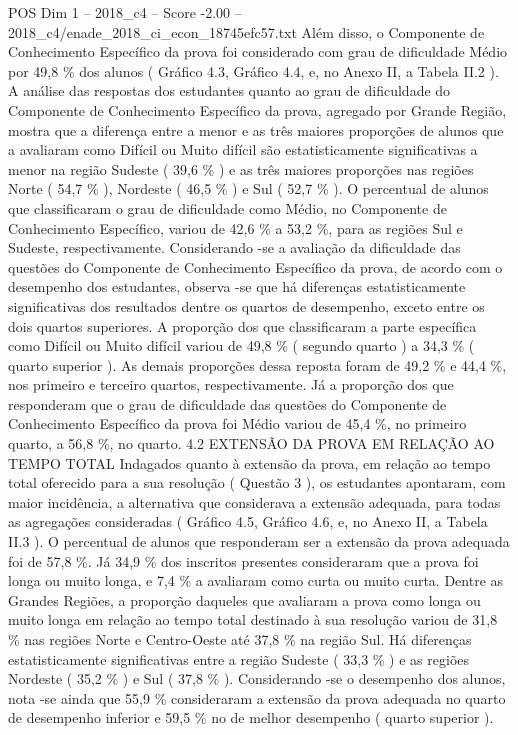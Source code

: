 \begin{textsample}{POS Dim 1 – 2018\_c4 – Score -2.00 – 2018\_c4/enade\_2018\_ci\_econ\_18745efc57.txt}
Além disso, o Componente de Conhecimento Específico da prova foi considerado com grau de dificuldade Médio por 49,8 \% dos alunos ( Gráfico 4.3, Gráfico 4.4, e, no Anexo II, a Tabela II.2 ).
A análise das respostas dos estudantes quanto ao grau de dificuldade do Componente de Conhecimento Específico da prova, agregado por Grande Região, mostra que a diferença entre a menor e as três maiores proporções de alunos que a avaliaram como Difícil ou Muito difícil são estatisticamente significativas a menor na região Sudeste ( 39,6 \% ) e as três maiores proporções nas regiões Norte ( 54,7 \% ), Nordeste ( 46,5 \% ) e Sul ( 52,7 \% ).
O percentual de alunos que classificaram o grau de dificuldade como Médio, no Componente de Conhecimento Específico, variou de 42,6 \% a 53,2 \%, para as regiões Sul e Sudeste, respectivamente.
Considerando -se a avaliação da dificuldade das questões do Componente de Conhecimento Específico da prova, de acordo com o desempenho dos estudantes, observa -se que há diferenças estatisticamente significativas dos resultados dentre os quartos de desempenho, exceto entre os dois quartos superiores.
A proporção dos que classificaram a parte específica como Difícil ou Muito difícil variou de 49,8 \% ( segundo quarto ) a 34,3 \% ( quarto superior ).
As demais proporções dessa reposta foram de 49,2 \% e 44,4 \%, nos primeiro e terceiro quartos, respectivamente.
Já a proporção dos que responderam que o grau de dificuldade das questões do Componente de Conhecimento Específico da prova foi Médio variou de 45,4 \%, no primeiro quarto, a 56,8 \%, no quarto. 4.2 EXTENSÃO DA PROVA EM RELAÇÃO AO TEMPO TOTAL Indagados quanto à extensão da prova, em relação ao tempo total oferecido para a sua resolução ( Questão 3 ), os estudantes apontaram, com maior incidência, a alternativa que considerava a extensão adequada, para todas as agregações consideradas ( Gráfico 4.5, Gráfico 4.6, e, no Anexo II, a Tabela II.3 ).
O percentual de alunos que responderam ser a extensão da prova adequada foi de 57,8 \%.
Já 34,9 \% dos inscritos presentes consideraram que a prova foi longa ou muito longa, e 7,4 \% a avaliaram como curta ou muito curta.
Dentre as Grandes Regiões, a proporção daqueles que avaliaram a prova como longa ou muito longa em relação ao tempo total destinado à sua resolução variou de 31,8 \% nas regiões Norte e Centro-Oeste até 37,8 \% na região Sul.
Há diferenças estatisticamente significativas entre a região Sudeste ( 33,3 \% ) e as regiões Nordeste ( 35,2 \% ) e Sul ( 37,8 \% ).
Considerando -se o desempenho dos alunos, nota -se ainda que 55,9 \% consideraram a extensão da prova adequada no quarto de desempenho inferior e 59,5 \% no de melhor desempenho ( quarto superior ).

\end{textsample}
